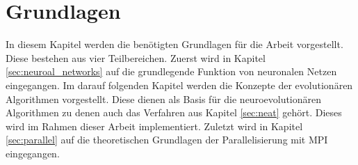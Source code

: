\chapter{Grundlagen}
\label{chap:basics}
In diesem Kapitel werden die benötigten Grundlagen für die Arbeit vorgestellt. Diese bestehen aus vier Teilbereichen. Zuerst wird in Kapitel \ref{sec:neuroal_networks} auf die grundlegende Funktion von neuronalen Netzen eingegangen. Im darauf folgenden Kapitel werden die Konzepte der evolutionären Algorithmen vorgestellt. Diese dienen als Basis für die neuroevolutionären Algorithmen zu denen auch das Verfahren aus Kapitel \ref{sec:neat} gehört. Dieses wird im Rahmen dieser Arbeit implementiert. Zuletzt wird in Kapitel \ref{sec:parallel} auf die theoretischen Grundlagen der Parallelisierung mit \acs*{MPI} eingegangen.





